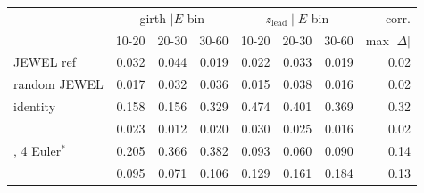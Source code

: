 \scriptsize
\setlength{\tabcolsep}{3pt}
\begin{tabular}{lrrrrrrr}
\toprule
 & \multicolumn{3}{c}{girth $\mid E$ bin} & \multicolumn{3}{c}{$z_\mathrm{lead} \mid E$ bin} & corr. \\
 & 10-20 & 20-30 & 30-60 & 10-20 & 20-30 & 30-60 & max $|\Delta|$ \\
\midrule
JEWEL ref & 0.032 & 0.044 & 0.019 & 0.022 & 0.033 & 0.019 & 0.02 \\
random JEWEL & 0.017 & 0.032 & 0.036 & 0.015 & 0.038 & 0.016 & 0.02 \\
identity & 0.158 & 0.156 & 0.329 & 0.474 & 0.401 & 0.369 & 0.32 \\
\midrule
\ot{} & 0.023 & 0.012 & 0.020 & 0.030 & 0.025 & 0.016 & 0.02 \\
\ot{}, 4 Euler$^\ast$ & 0.205 & 0.366 & 0.382 & 0.093 & 0.060 & 0.090 & 0.14 \\
\dsbm{} & 0.095 & 0.071 & 0.106 & 0.129 & 0.161 & 0.184 & 0.13 \\
\bottomrule
\end{tabular}
